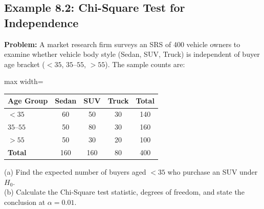 \subsection*{Example 8.2: Chi-Square Test for Independence}
\textbf{Problem:} A market research firm surveys an SRS of 400 vehicle owners to examine whether vehicle body style (Sedan, SUV, Truck) is independent of buyer age bracket ($<35$, $35\text{--}55$, $>55$). The sample counts are:
\begin{center}
\begin{adjustbox}{max width=\linewidth}
\begin{tabular}{lcccc}
\toprule
\textbf{Age Group} & \textbf{Sedan} & \textbf{SUV} & \textbf{Truck} & \textbf{Total} \\
\midrule
$< 35$ & 60 & 50 & 30 & 140 \\
$35\text{--}55$ & 50 & 80 & 30 & 160 \\
$> 55$ & 50 & 30 & 20 & 100 \\
\midrule
\textbf{Total} & 160 & 160 & 80 & 400 \\
\bottomrule
\end{tabular}
\end{adjustbox}
\end{center}
(a) Find the expected number of buyers aged $<35$ who purchase an SUV under $H_0$.\\
(b) Calculate the Chi-Square test statistic, degrees of freedom, and state the conclusion at $\alpha = 0.01$.

